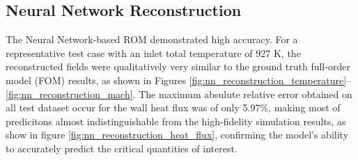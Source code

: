 \documentclass[tg, EN]{ufabcFHZh_tg}
\begin{document}
\subsection{Neural Network Reconstruction}

The Neural Network-based ROM demonstrated high accuracy. For a representative test case with an inlet total temperature of 927 K, the reconstructed fields were qualitatively very similar to the ground truth full-order model (FOM) results, as shown in Figures \ref{fig:nn_reconstruction_temperature}--\ref{fig:nn_reconstruction_mach}. The maximum absulute relative error obtained on all test dataset occur for the wall heat flux was of only 5.97\%, making most of predicitons almost indistinguishable from the high-fidelity simulation results, as show in figure \ref{fig:nn_reconstruction_heat_flux}, confirming the model's ability to accurately predict the critical quantities of interest.
\end{document}
